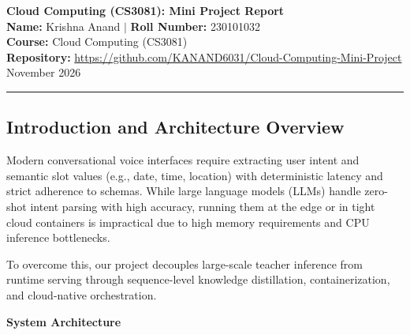 \documentclass[10pt,a4paper]{article}
\begin{document}
\begin{center}
    {\Large\bfseries Cloud Computing (CS3081): Mini Project Report}\\[5pt]
    \textbf{Name:} Krishna Anand \quad $\vert$ \quad \textbf{Roll Number:} 230101032\\[2pt]
    \textbf{Course:} Cloud Computing (CS3081)\\[2pt]
    \textbf{Repository:} \url{https://github.com/KANAND6031/Cloud-Computing-Mini-Project}\\[4pt]
    November 2026
\end{center}
\vspace{2pt}
\hrule
\vspace{5pt}

\subsection*{Introduction and Architecture Overview}
Modern conversational voice interfaces require extracting user intent and semantic slot values (e.g., date, time, location) with deterministic latency and strict adherence to schemas. While large language models (LLMs) handle zero-shot intent parsing with high accuracy, running them at the edge or in tight cloud containers is impractical due to high memory requirements and CPU inference bottlenecks.

To overcome this, our project decouples large-scale teacher inference from runtime serving through sequence-level knowledge distillation, containerization, and cloud-native orchestration.

\textbf{System Architecture}
\end{document}
